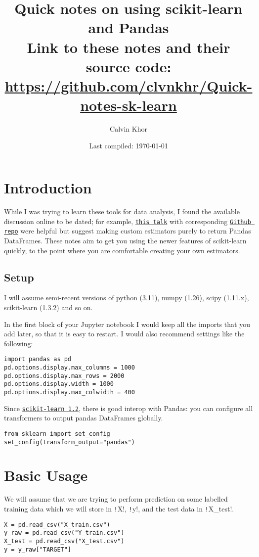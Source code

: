 \documentclass[11pt]{article}
\theoremstyle{definition}
\newcommand{\myhref}[2]{\href{#1}{\texttt{#2}}}
\begin{document}
\title{Quick notes on using scikit-learn and Pandas\\ \footnotesize{Link to these notes and their source code: \url{https://github.com/clvnkhr/Quick-notes-sk-learn}}}
\author{Calvin Khor}

\date{Last compiled: \today}
\maketitle

\section{Introduction}
While I was trying to learn these tools for data analysis, I found the available discussion online to be dated; for example, \myhref{https://www.youtube.com/watch?v=BFaadIqWlAg&list=PLzERW_Obpmv_t55kNFRet-E0h1nKeswWF&index=26}{this talk} with corresponding \myhref{https://github.com/jem1031/pandas-pipelines-custom-transformers}{Github repo} were helpful but suggest making custom estimators purely to return Pandas DataFrames. These notes aim to get you using the newer features of scikit-learn quickly, to the point where you are comfortable creating your own estimators.
\subsection{Setup}
I will assume semi-recent versions of python (3.11), numpy (1.26), scipy (1.11.x), scikit-learn (1.3.2) and so on.

In the first block of your Jupyter notebook I would keep all the imports that you add later, so that it is easy to restart. I would also recommend settings like the following:
\begin{verbatim}
import pandas as pd
pd.options.display.max_columns = 1000
pd.options.display.max_rows = 2000
pd.options.display.width = 1000
pd.options.display.max_colwidth = 400
\end{verbatim}
Since \myhref{https://scikit-learn.org/stable/auto_examples/release_highlights/plot_release_highlights_1_2_0.html}{scikit-learn 1.2}, there is good interop with Pandas: you can configure all transformers to output pandas DataFrames globally.
\begin{verbatim}
from sklearn import set_config
set_config(transform_output="pandas")
\end{verbatim}

\section{Basic Usage}
We will assume that we are trying to perform prediction on some labelled training data which we will store in \texttt!X!, \texttt!y!, and the test data in \texttt!X_test!.
\begin{verbatim}
X = pd.read_csv("X_train.csv") 
y_raw = pd.read_csv("Y_train.csv")  
X_test = pd.read_csv("X_test.csv")
y = y_raw["TARGET"]
\end{verbatim}
\end{document}
